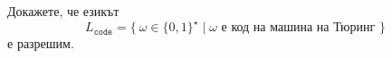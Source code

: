 
\begin{problem}
  Докажете, че езикът 
  \[L_{\texttt{code}} = \{\ \omega \in \{0,1\}^\star \mid \omega \text{ е код на машина на Тюринг } \}\]
  е разрешим.
\end{problem}

